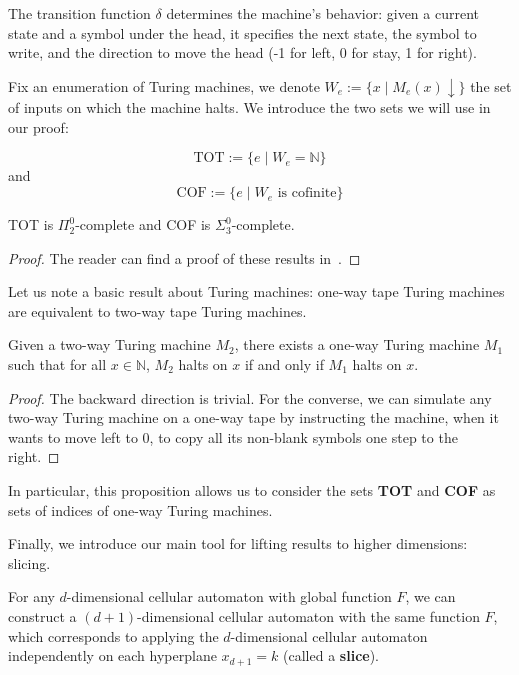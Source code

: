 \documentclass{llncs}
\begin{document}
The transition function $\delta$ determines the machine's behavior: given a current state and a symbol under the head, it specifies the next state, the symbol to write, and the direction to move the head (-1 for left, 0 for stay, 1 for right).

Fix an enumeration of Turing machines, we denote $W_e := \{x \mid M_e(x) \downarrow\}$ the set of inputs on which the machine halts. We introduce the two sets we will use in our proof:

\begin{equation}
    \text{TOT} := \{e \mid W_e = \mathbb{N}\}
\end{equation}
and 
\begin{equation}
    \text{COF} := \{e \mid W_e \text{ is cofinite}\}
\end{equation}
\begin{lemma}
    TOT is $\Pi^0_2$-complete and COF is $\Sigma^0_3$-complete. 
\end{lemma}

\begin{proof}
The reader can find a proof of these results in~\cite{rogers1987}. 
\end{proof}


Let us note a basic result about Turing machines: one-way tape Turing machines are equivalent to two-way tape Turing machines.

\begin{proposition}
Given a two-way Turing machine $M_2$, there exists a one-way Turing machine $M_1$ such that for all $x \in \mathbb{N}$, $M_2$ halts on $x$ if and only if $M_1$ halts on $x$. 
\end{proposition}

\begin{proof}
The backward direction is trivial. For the converse, we can simulate any two-way Turing machine on a one-way tape by instructing the machine, when it wants to move left to $0$, to copy all its non-blank symbols one step to the right.\end{proof}

In particular, this proposition allows us to consider the sets \textbf{TOT} and \textbf{COF} as sets of indices of one-way Turing machines.  

Finally, we introduce our main tool for lifting results to higher dimensions: slicing.  

\begin{definition}[Slicing]  
For any $d$-dimensional cellular automaton with global function $F$, we can construct a $(d+1)$-dimensional cellular automaton with the same function $F$, which corresponds to applying the $d$-dimensional cellular automaton independently on each hyperplane $x_{d+1} = k$ (called a \textbf{slice}).  
\end{definition}  
\end{document}
